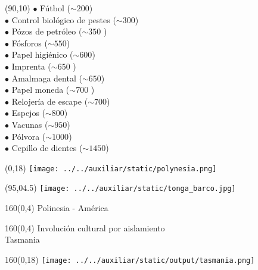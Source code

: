 \documentclass[shownotes,aspectratio=169]{beamer}
\begin{document}
\begin{frame}[plain]
 
 \begin{textblock}{70}(90,10) \footnotesize
 $\bullet$ Fútbol ($\sim 200$) \\
 $\bullet$ Control biológico de pestes ($\sim 300$) \\
 $\bullet$ Pózos de petróleo ($\sim 350$ ) \\
 $\bullet$ Fósforos ($\sim 550$) \\
 $\bullet$ Papel higiénico ($\sim 600$) \\
 $\bullet$ Imprenta ($\sim 650$ ) \\
 $\bullet$ Amalmaga dental ($\sim 650$) \\
 $\bullet$ Papel moneda ($\sim 700$ ) \\
 $\bullet$ Relojería de escape ($\sim 700$) \\
 $\bullet$ Espejos ($\sim 800$) \\
 $\bullet$ Vacunas ($\sim 950$) \\
 $\bullet$ Pólvora ($\sim 1000$) \\
 $\bullet$ Cepillo de dientes ($\sim 1450$)
 \end{textblock} 
 
  
\end{frame}


\begin{frame}[plain]
\begin{textblock}{95}(0,18) \centering
\texttt{[image: ../../auxiliar/static/polynesia.png]}  
\end{textblock} 

\begin{textblock}{60}(95,04.5) \centering
\texttt{[image: ../../auxiliar/static/tonga\_barco.jpg]}  
\end{textblock} 

\begin{textblock}{160}(0,4)
\centering \LARGE  \textcolor{black!85}{Polinesia - América}
\end{textblock}

\end{frame}

\begin{frame}[plain]
\begin{textblock}{160}(0,4)
\centering \LARGE  \textcolor{black!85}{Involución cultural por aislamiento} \\
\Large Tasmania
\end{textblock}

\begin{textblock}{160}(0,18)
  \centering
\texttt{[image: ../../auxiliar/static/output/tasmania.png]}  
  \end{textblock} 

\end{frame}
\end{document}
